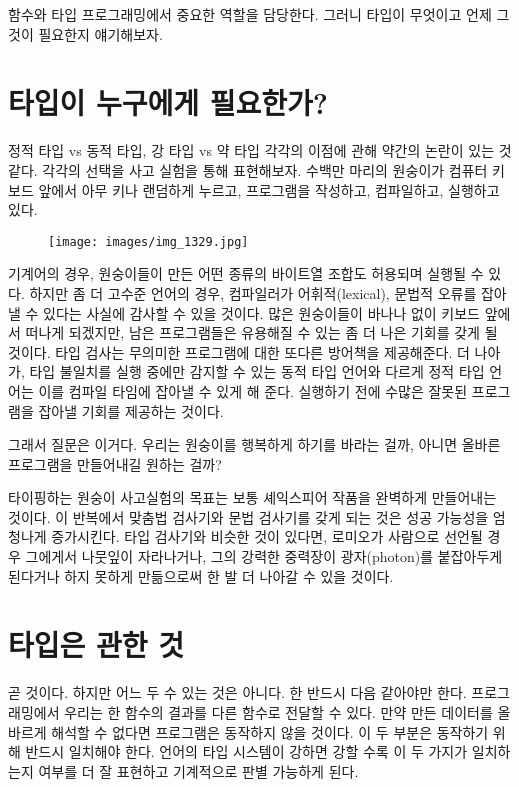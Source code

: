
\lettrine[lhang=0.17]{함}{수}와 타입 \trCategory\는  프로그래밍에서 중요한 역할을 담당한다. 그러니 타입이 무엇이고 언제 그것이 필요한지 얘기해보자.

\section{타입이 누구에게 필요한가?}

정적 타입 vs 동적 타입, 강 타입 vs 약 타입 각각의 이점에 관해 약간의 논란이 있는 것 같다.
각각의 선택을 사고 실험을 통해 표현해보자. 수백만 마리의 원숭이가 컴퓨터 키보드 앞에서 아무 키나 랜덤하게 누르고, 프로그램을 작성하고, 컴파일하고, 실행하고 있다.

\begin{figure}[H]
\centering
\texttt{[image: images/img\_1329.jpg]}
\end{figure}

\noindent
기계어의 경우, 원숭이들이 만든 어떤 종류의 바이트열 조합도 허용되며 실행될 수 있다.
하지만 좀 더 고수준 언어의 경우, 컴파일러가 어휘적(lexical), 문법적 오류를 잡아낼 수 있다는 사실에 감사할 수 있을 것이다.
많은 원숭이들이 바나나 없이 키보드 앞에서 떠나게 되겠지만, 남은 프로그램들은 유용해질 수 있는 좀 더 나은 기회를 갖게 될 것이다.
타입 검사는 무의미한 프로그램에 대한 또다른 방어책을 제공해준다.
더 나아가, 타입 불일치를 실행 중에만 감지할 수 있는 동적 타입 언어와 다르게 정적 타입 언어는 이를 컴파일 타임에 잡아낼 수 있게 해 준다.
실행하기 전에 수많은 잘못된 프로그램을 잡아낼 기회를 제공하는 것이다.

그래서 질문은 이거다. 우리는 원숭이를 행복하게 하기를 바라는 걸까, 아니면 올바른 프로그램을 만들어내길 원하는 걸까?

타이핑하는 원숭이 사고실험의 목표는 보통 셰익스피어 작품을 완벽하게 만들어내는 것이다.
이 반복에서 맞춤법 검사기와 문법 검사기를 갖게 되는 것은 성공 가능성을 엄청나게 증가시킨다.
타입 검사기와 비슷한 것이 있다면, 로미오가 사람으로 선언될 경우 그에게서 나뭇잎이 자라나거나, 그의 강력한 중력장이 광자(photon)를 붙잡아두게 된다거나 하지 못하게 만듦으로써 한 발 더 나아갈 수 있을 것이다.

\section{타입은  관한 것}

\trCategoryTheory{} 곧 \trArrow\를  것이다. 하지만 어느 두   수 있는 것은 아니다. 
한  \trTargetObject\는 반드시 다음  \trSourceObject\와 같아야만 한다.
프로그래밍에서 우리는 한 함수의 결과를 다른 함수로 전달할 수 있다.
만약 \trTargetFunction\이  만든 데이터를 올바르게 해석할 수 없다면 프로그램은 동작하지 않을 것이다.
이 두 부분은 \trComposition\이 동작하기 위해 반드시 일치해야 한다.
언어의 타입 시스템이 강하면 강할 수록 이 두 가지가 일치하는지 여부를 더 잘 표현하고 기계적으로 판별 가능하게 된다.

